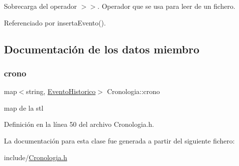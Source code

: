 Sobrecarga del operador $>$$>$. Operador que se usa para leer de un fichero. 



Referenciado por inserta\+Evento().



\subsection{Documentación de los datos miembro}
\hypertarget{classCronologia_a5ba99beab3de21fd9c1c4c3555839d76}{}\label{classCronologia_a5ba99beab3de21fd9c1c4c3555839d76} 
\subsubsection{\texorpdfstring{crono}{crono}}
{\footnotesize\ttfamily map$<$string, \hyperlink{classEventoHistorico}{Evento\+Historico}$>$ Cronologia\+::crono\hspace{0.3cm}{\ttfamily [private]}}

map de la stl 

Definición en la línea 50 del archivo Cronologia.\+h.



La documentación para esta clase fue generada a partir del siguiente fichero\+:\begin{DoxyCompactItemize}
\item 
include/\hyperlink{Cronologia_8h}{Cronologia.\+h}\end{DoxyCompactItemize}
